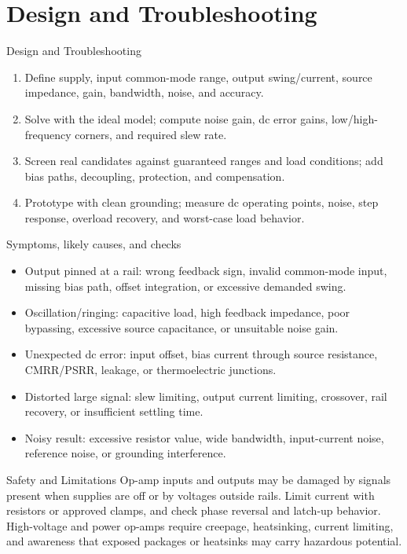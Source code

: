\documentclass[10pt,letterpaper]{article}
\begin{document}
\section{Design and Troubleshooting}
\begin{CornellExamBox}{Design and Troubleshooting}
\begin{enumerate}
  \item Define supply, input common-mode range, output swing/current, source impedance, gain, bandwidth, noise, and accuracy.
  \item Solve with the ideal model; compute noise gain, dc error gains, low/high-frequency corners, and required slew rate.
  \item Screen real candidates against guaranteed ranges and load conditions; add bias paths, decoupling, protection, and compensation.
  \item Prototype with clean grounding; measure dc operating points, noise, step response, overload recovery, and worst-case load behavior.
\end{enumerate}\end{CornellExamBox}
\begin{CornellExamBox}{Symptoms, likely causes, and checks}
\begin{itemize}
  \item Output pinned at a rail: wrong feedback sign, invalid common-mode input, missing bias path, offset integration, or excessive demanded swing.
  \item Oscillation/ringing: capacitive load, high feedback impedance, poor bypassing, excessive source capacitance, or unsuitable noise gain.
  \item Unexpected dc error: input offset, bias current through source resistance, CMRR/PSRR, leakage, or thermoelectric junctions.
  \item Distorted large signal: slew limiting, output current limiting, crossover, rail recovery, or insufficient settling time.
  \item Noisy result: excessive resistor value, wide bandwidth, input-current noise, reference noise, or grounding interference.
\end{itemize}\end{CornellExamBox}
\begin{CornellWarningBox}{Safety and Limitations}
Op-amp inputs and outputs may be damaged by signals present when supplies are off or by voltages outside rails. Limit current with resistors or approved clamps, and check phase reversal and latch-up behavior. High-voltage and power op-amps require creepage, heatsinking, current limiting, and awareness that exposed packages or heatsinks may carry hazardous potential.
\end{CornellWarningBox}
\end{document}
